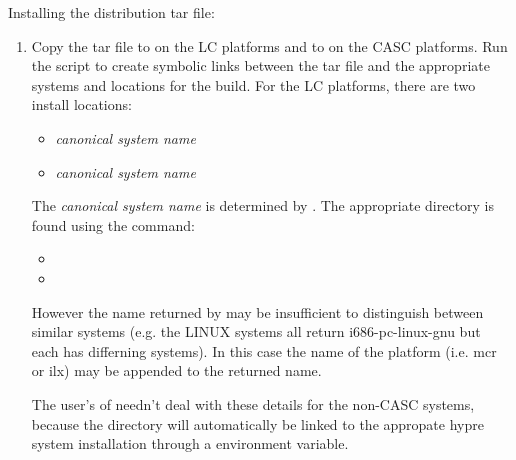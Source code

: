 Installing the \hypre{} distribution tar file:

\begin{enumerate}

   \item Copy the tar file  to 
   on the LC platforms and to  on the CASC platforms.
   Run the script  to create symbolic links between the tar 
   file and the appropriate systems and locations for the build. For the LC
   platforms, there are two install locations:
      \begin{itemize}
       \item {}\textit{canonical system name}
       \item {}\textit{canonical system name}
      \end{itemize}

   The \textit{canonical system name} is determined by . 
   The appropriate directory is found using the command:
      \begin{itemize}
       \item {}
       \item {}
      \end{itemize}

   However the name returned by  may be insufficient to
   distinguish between similar systems (e.g. the LINUX systems all return
   i686-pc-linux-gnu but each has differning systems). In this case the name of
   the platform (i.e. mcr or ilx) may be appended to the returned name.
   
   The user's of \hypre{} needn't deal with these details for the non-CASC systems,
   because the  directory will automatically be linked to the
   appropate hypre system installation through a  environment 
   variable.


\end{enumerate}
